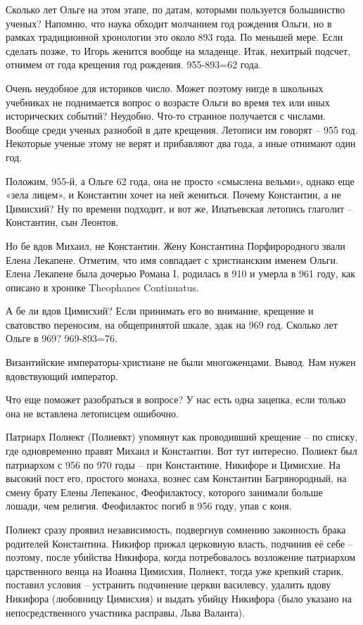 Сколько лет Ольге на этом этапе, по датам, которыми пользуется большинство ученых? Напомню, что наука обходит молчанием год рождения Ольги, но в рамках традиционной хронологии это около 893 года. По меньшей мере. Если сделать позже, то Игорь женится вообще на младенце. Итак, нехитрый подсчет, отнимем от года крещения год рождения. 955-893=62 года.

Очень неудобное для историков число. Может поэтому нигде в школьных учебниках не поднимается вопрос о возрасте Ольги во время тех или иных исторических событий? Неудобно. Что-то странное получается с числами. Вообще среди ученых разнобой в дате крещения. Летописи им говорят – 955 год. Некоторые ученые этому не верят и прибавляют два года, а иные отнимают один год.

Положим, 955-й, а Ольге 62 года, она не просто «смыслена вельми», однако еще «зела лицем», и Константин хочет на ней жениться. Почему Константин, а не Цимисхий? Ну по времени подходит, и вот же, Ипатьевская летопись глаголит – Константин, сын Леонтов.

Но бе вдов Михаил, не Константин. Жену Константина Порфирородного звали Елена Лекапене. Отметим, что имя совпадает с христианским именем Ольги. Елена Лекапене была дочерью Романа I, родилась в 910 и умерла в 961 году, как описано в хронике Theophanes Continuatus. 

А бе ли вдов Цимисхий? Если принимать его во внимание, крещение и сватовство переносим, на общепринятой шкале, эдак на 969 год. Сколько лет Ольге в 969? 969-893=76.

Византийские императоры-христиане не были многоженцами. Вывод. Нам нужен вдовствующий император.

Что еще поможет разобраться в вопросе? У нас есть одна зацепка, если только она не вставлена летописцем ошибочно.

Патриарх Полиект (Полиевкт) упомянут как проводивший крещение – по списку, где одновременно правят Михаил и Константин. Вот тут интересно. Полиект был патриархом с 956 по 970 годы – при Константине, Никифоре и Цимисхие. На высокий пост его, простого монаха, вознес сам Константин Багрянородный, на смену брату Елены Лепеканос, Феофилактосу, которого занимали больше лошади, чем религия. Феофилактос погиб в 956 году, упав с коня.

Полиект сразу проявил независимость, подвергнув сомнению законность брака родителей Константина. Никифор прижал церковную власть, подчинив её себе – поэтому, после убийства Никифора, когда потребовалось возложение патриархом царственного венца на Иоанна Цимисхия, Полиект, тогда уже крепкий старик, поставил условия – устранить подчинение церкви василевсу, удалить вдову Никифора (любовницу Цимисхия) и выдать убийцу Никифора (было указано на непосредственного участника расправы, Льва Валанта).

